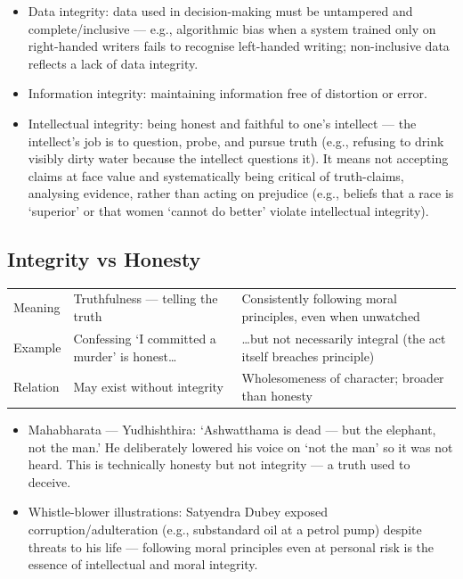 \begin{itemize}
\item Data integrity: data used in decision-making must be untampered and complete/inclusive --- e.g., algorithmic bias when a system trained only on right-handed writers fails to recognise left-handed writing; non-inclusive data reflects a lack of data integrity.
\item Information integrity: maintaining information free of distortion or error.
\item Intellectual integrity: being honest and faithful to one's intellect --- the intellect's job is to question, probe, and pursue truth (e.g., refusing to drink visibly dirty water because the intellect questions it). It means not accepting claims at face value and systematically being critical of truth-claims, analysing evidence, rather than acting on prejudice (e.g., beliefs that a race is `superior' or that women `cannot do better' violate intellectual integrity).
\end{itemize}

\subsection{Integrity vs Honesty}

\begin{center}
\begin{tabularx}{\textwidth}{>{\raggedright\arraybackslash}p{2.3cm} Y Y}
 &  &  \\
\toprule
Meaning & Truthfulness --- telling the truth & Consistently following moral principles, even when unwatched \\
Example & Confessing `I committed a murder' is honest\ldots & \ldots but not necessarily integral (the act itself breaches principle) \\
Relation & May exist without integrity & Wholesomeness of character; broader than honesty \\
\bottomrule
\end{tabularx}
\end{center}

\begin{ExampleBox}
\begin{itemize}
\item Mahabharata --- Yudhishthira: `Ashwatthama is dead --- but the elephant, not the man.' He deliberately lowered his voice on `not the man' so it was not heard. This is technically honesty but not integrity --- a truth used to deceive.
\item Whistle-blower illustrations: Satyendra Dubey exposed corruption/adulteration (e.g., substandard oil at a petrol pump) despite threats to his life --- following moral principles even at personal risk is the essence of intellectual and moral integrity.
\end{itemize}
\end{ExampleBox}

